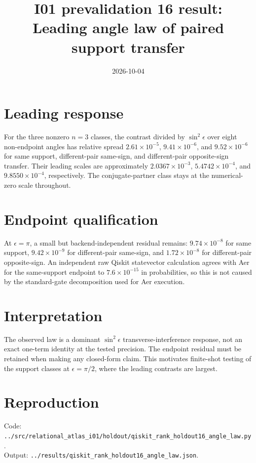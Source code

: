 \documentclass[11pt]{article}
\begin{document}
\title{I01 prevalidation 16 result:\\Leading angle law of paired support transfer}
\date{2026-10-04}
\maketitle

\section*{Leading response}
For the three nonzero $n=3$ classes, the contrast divided by $\sin^2\epsilon$
over eight non-endpoint angles has relative spread $2.61\times10^{-5}$,
$9.41\times10^{-6}$, and $9.52\times10^{-6}$ for same support, different-pair
same-sign, and different-pair opposite-sign transfer. Their leading scales are
approximately $2.0367\times10^{-3}$, $5.4742\times10^{-4}$, and
$9.8550\times10^{-4}$, respectively. The conjugate-partner class stays at the
numerical-zero scale throughout.

\section*{Endpoint qualification}
At $\epsilon=\pi$, a small but backend-independent residual remains:
$9.74\times10^{-8}$ for same support, $9.42\times10^{-9}$ for different-pair
same-sign, and $1.72\times10^{-8}$ for different-pair opposite-sign. An independent
raw Qiskit statevector calculation agrees with Aer for the same-support endpoint to
$7.6\times10^{-15}$ in probabilities, so this is not caused by the standard-gate
decomposition used for Aer execution.

\section*{Interpretation}
The observed law is a dominant $\sin^2\epsilon$ transverse-interference response,
not an exact one-term identity at the tested precision. The endpoint residual must
be retained when making any closed-form claim. This motivates finite-shot testing of
the support classes at $\epsilon=\pi/2$, where the leading contrasts are largest.

\section*{Reproduction}
Code: \texttt{../src/relational\_atlas\_i01/holdout/qiskit\_rank\_holdout16\_angle\_law.py}.\\
Output: \texttt{../results/qiskit\_rank\_holdout16\_angle\_law.json}.
\end{document}
